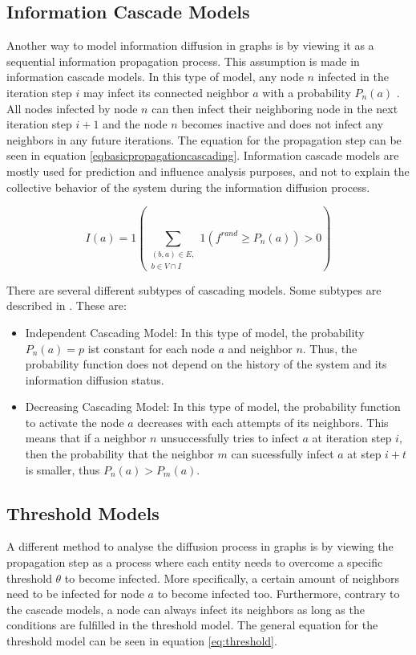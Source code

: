 \subsection{Information Cascade Models}

Another way to model information diffusion in graphs is by viewing it as a 
sequential information propagation process. This assumption is made in
information cascade models. In this type of model, any node $n$ infected in the
iteration step $i$ may infect its connected neighbor $a$ with a probability $P_n(a)$
\cite{reviewinformationdiffusion}. All nodes infected by node $n$
can then infect their neighboring node in the next iteration step $i+1$
and the node $n$ becomes inactive and does not infect any neighbors in any future
iterations.
The equation for the propagation step can be seen in equation 
\ref{eqbasicpropagationcascading}.
Information cascade models are mostly used for prediction and influence 
analysis purposes, and not to explain the collective behavior
of the system during the information diffusion process.

\begin{equation}
    I(a) = 1 (\sum\limits_{\substack{(b,a)\in E, \\ b \in V \cap I}}
    1(f^{rand}\geq P_n(a))>0) 
    \label{eqbasicpropagationcascading}
\end{equation}

There are several different subtypes of cascading models.
Some subtypes are described in \cite{diffusionbasics}. These are:

\begin{itemize}
    \item Independent Cascading Model: In this type of model, the 
    probability $P_n(a)=p$ ist constant for each node $a$ and neighbor $n$.
    Thus, the probability function does not depend on the history 
    of the system and its information diffusion status.
    \item Decreasing Cascading Model: In this type of model, the probability
    function to activate the node $a$ decreases with each attempts of its 
    neighbors. This means that if a neighbor $n$ unsuccessfully tries to infect
    $a$ at iteration step $i$, then the probability that the neighbor $m$
    can sucessfully infect $a$ at step $i+t$ is smaller, thus $P_n(a)>P_m(a)$.
\end{itemize}

\subsection{Threshold Models}
A different method to analyse the diffusion process in graphs is by viewing the
propagation step as a process where each entity needs to overcome a 
specific threshold $\theta$ to become infected. More specifically, 
a certain amount of neighbors need to be infected for node $a$ to become 
infected too. Furthermore, contrary to the cascade models, a node can always 
infect its neighbors as long as the conditions are fulfilled in the threshold 
model. The general equation for the threshold model can be seen in equation
\ref{eq:threshold}.

